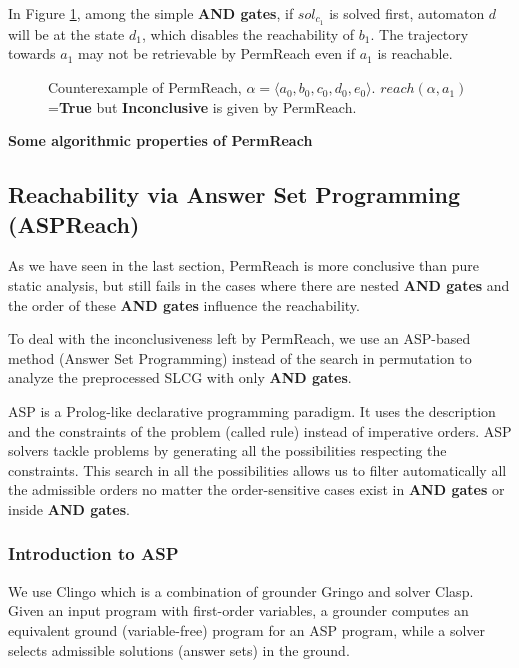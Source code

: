 \begin{example}\label{ex:counterPerm}
In Figure \ref{FigConflictInForks}, among the simple \textbf{AND gates}, if $sol_{c_1}$ is solved first, automaton $d$ will be at the state $d_1$, which disables the reachability of $b_1$.
The trajectory towards $a_1$ may not be retrievable by PermReach even if $a_1$ is reachable.
\end{example}

\begin{figure}[ht]
\centering

\caption[Counterexample of PermReach]{Counterexample of PermReach, $\alpha=\langle a_0,b_0,c_0,d_0,e_0\rangle$. 
$reach(\alpha,a_1)$=\textbf{True} but \textbf{Inconclusive} is given by PermReach.
}\label{FigConflictInForks}
\end{figure}

\textbf{Some algorithmic properties of PermReach}

\subsection{Reachability via Answer Set Programming (ASPReach)}

As we have seen in the last section, PermReach is more conclusive than pure static analysis, but still fails in the cases where there are nested \textbf{AND gates} and the order of these \textbf{AND gates} influence the reachability.

To deal with the inconclusiveness left by PermReach, we use an ASP-based method (Answer Set Programming) \cite{baral2003knowledge} instead of the search in permutation to analyze the preprocessed SLCG with only \textbf{AND gates}.

ASP is a Prolog-like declarative programming paradigm.
It uses the description and the constraints of the problem (called rule) instead of imperative orders.
ASP solvers tackle problems by generating all the possibilities respecting the constraints. 
This search in all the possibilities allows us to filter automatically all the admissible orders no matter the order-sensitive cases exist in \textbf{AND gates} or inside \textbf{AND gates}.

\subsubsection{Introduction to ASP}\label{sec:introAsp}
We use Clingo \cite{gebser2016theory} which is a combination of grounder Gringo and solver Clasp. 
Given an input program with first-order variables, a grounder computes an equivalent ground (variable-free) program for an ASP program, while a solver selects admissible solutions (answer sets) in the ground.

